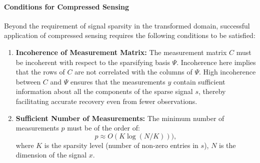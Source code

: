 \documentclass[11pt]{article}
\begin{document}
\paragraph*{Conditions for Compressed Sensing}
Beyond the requirement of signal sparsity in the transformed domain, successful application of compressed sensing requires the following conditions to be satisfied:
\begin{enumerate}
    \item \textbf{Incoherence of Measurement Matrix:}
    The measurement matrix \( C \) must be incoherent with respect to the sparsifying basis \( \Psi \). Incoherence here implies that the rows of \( C \) are not correlated with the columns of \( \Psi \). High incoherence between \( C \) and \( \Psi \) ensures that the measurements \( y \) contain sufficient information about all the components of the sparse signal \( s \), thereby facilitating accurate recovery even from fewer observations.
    
    \item \textbf{Sufficient Number of Measurements:}
    The minimum number of measurements \( p \) must be of the order of:
    \[
    p \approx O(K \log(N/K))),
    \]
    where \( K \) is the sparsity level (number of non-zero entries in \( s \)), \( N \) is the dimension of the signal \( x \).
\end{enumerate}
\end{document}
